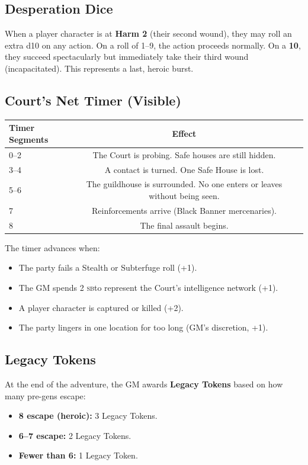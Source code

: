 \documentclass[10pt,twoside]{book}
\newcommand{\sb}{\textsc{sb}}
\begin{document}
\subsection{Desperation Dice}

When a player character is at \textbf{Harm 2} (their second wound), they may roll an extra d10 on any action. On a roll of 1--9, the action proceeds normally. On a \textbf{10}, they succeed spectacularly but immediately take their third wound (incapacitated). This represents a last, heroic burst.

\subsection{Court's Net Timer (Visible)}

\begin{longtable}{p{4cm} c p{5cm}}
\toprule
\textbf{Timer Segments} & \textbf{Effect} \\
\midrule
0--2 & The Court is probing. Safe houses are still hidden. \\
3--4 & A contact is turned. One Safe House is lost. \\
5--6 & The guildhouse is surrounded. No one enters or leaves without being seen. \\
7 & Reinforcements arrive (Black Banner mercenaries). \\
8 & The final assault begins. \\
\bottomrule
\end{longtable}

The timer advances when:
\begin{itemize}
\item The party fails a Stealth or Subterfuge roll (+1).
\item The GM spends 2 \sb to represent the Court's intelligence network (+1).
\item A player character is captured or killed (+2).
\item The party lingers in one location for too long (GM's discretion, +1).
\end{itemize}

\subsection{Legacy Tokens}

At the end of the adventure, the GM awards \textbf{Legacy Tokens} based on how many pre-gens escape:

\begin{itemize}
\item \textbf{8 escape (heroic):} 3 Legacy Tokens.
\item \textbf{6--7 escape:} 2 Legacy Tokens.
\item \textbf{Fewer than 6:} 1 Legacy Token.
\end{itemize}
\end{document}
